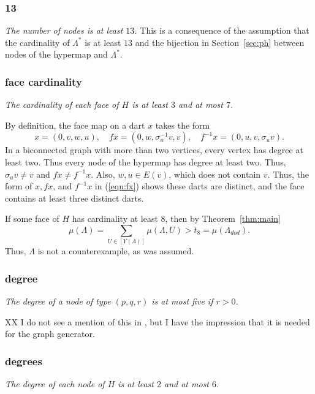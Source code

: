\subsubsection{13}

{\it The number of nodes is at least $13$.}  This is a consequence of the assumption
that the cardinality of $\Lambda^*$ is at least $13$ and the bijection in
Section~\ref{sec:ph} between nodes of the hypermap and $\Lambda^*$.

\subsubsection{face cardinality}\label{sec:face}

{\it The cardinality of each face of $H$ is at least $3$ and at most $7$.}


By  definition, the face map on a dart $x$ takes the form
\begin{equation}\label{eqn:fx}
x = (0,v,w,u),\quad
f x = (0,w,\sigma_w^{-1}v,v),\quad
f^{-1} x = (0,u,v,\sigma_u v).
\end{equation}
In a biconnected graph with more than two vertices,
every vertex has degree at least two.
Thus every node of the hypermap has degree
at least two.  Thus, $\sigma_u v\ne v$ and $f x\ne f^{-1} x$.
Also, $w,u\in E(v)$, which does not contain $v$.  Thus, 
the form of $x,fx$, and 
$f^{-1} x$
in (\ref{eqn:fx}) shows these darts are distinct, and
the
face contains at least three distinct darts.

If some face of $H$ has cardinality at least $8$, then by Theorem~\ref{thm:main}
$$
\mu(\Lambda) =\sum_{U\in [Y(\Lambda)]}\mu(\Lambda,U) > t_8 =\mu(\Lambda_{dod}).
$$
Thus, $\Lambda$ is not a counterexample, as was assumed.

\subsubsection{degree}

{\it The degree of a node of type $(p,q,r)$ is at most five if $r>0$.}

XX I do not see a mention of this in \cite{arx}, but I have the impression
that it is needed for the graph generator.

\subsubsection{degrees}\label{sec:degrees}

{\it The degree of each node of $H$ is at least $2$ and at most $6$.}


